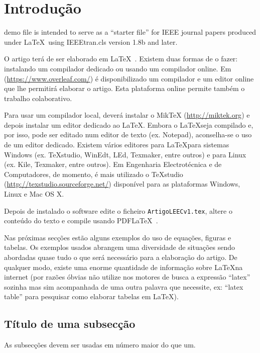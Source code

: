 \documentclass[journal, twoside, a4paper]{IEEEtran_LEEC_v1}
\begin{document}
\section{Introdução}
%
 demo file is intended to serve as a ``starter file''
for IEEE journal papers produced under \LaTeX\ using
IEEEtran.cls version 1.8b and later.

O artigo terá de ser elaborado em \LaTeX~\cite{Lamport}. Existem duas formas de o fazer: instalando um compilador dedicado ou usando um compilador online. Em (\url{https://www.overleaf.com/}) é disponibilizado um compilador e um editor online que lhe permitirá elaborar o artigo. Esta plataforma online permite também o trabalho colaborativo.

Para usar um compilador local, deverá instalar o MikTeX (\url{http://miktek.org}) e depois instalar um editor dedicado ao \LaTeX. Embora o \LaTeX seja compilado e, por isso, pode ser editado num editor de texto (ex. Notepad), aconselha-se o uso de um editor dedicado. Existem vários editores para \LaTeX para sistemas Windows (ex. TeXstudio, WinEdt, LEd, Texmaker, entre outros) e para Linux (ex. Kile, Texmaker, entre outros). Em Engenharia Electrotécnica e de Computadores, de momento, é mais utilizado o TeXstudio (\url{http://texstudio.sourceforge.net/}) disponível para as plataformas Windows, Linux e Mac OS X.

Depois de instalado o software edite o ficheiro \verb"ArtigoLEECv1.tex", altere o conteúdo do texto e compile usando PDFLaTeX~\cite{Bay1}.

Nas próximas secções estão alguns exemplos do uso de equações, figuras e tabelas. Os exemplos usados abrangem uma diversidade de situações sendo abordadas quase tudo o que será necessário para a elaboração do artigo. De qualquer modo, existe uma enorme quantidade de informação sobre \LaTeX na internet (por razões óbvias não utilize nos motores de busca a expressão ``latex'' sozinha mas sim acompanhada de uma outra palavra que necessite, ex: ``latex table'' para pesquisar como elaborar tabelas em \LaTeX).

\subsection{Título de uma subsecção}
As subsecções devem ser usadas em número maior do que um.
\end{document}
